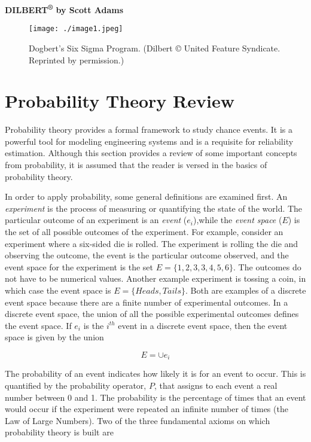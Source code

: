 \textbf{\hfill\break
DILBERT\textsuperscript{®} by Scott Adams}

\begin{figure}
\texttt{[image: ./image1.jpeg]}
\caption{Dogbert's Six Sigma Program. (Dilbert © United Feature Syndicate. Reprinted by
permission.)}
\label{figure:dilbert6sigma}
\end{figure}


\section{Probability Theory Review}
\label{section:probability-theory-review}

Probability theory provides a formal framework to study chance events.
It is a powerful tool for modeling engineering systems and is a
requisite for reliability estimation. Although this section provides a
review of some important concepts from probability, it is assumed that
the reader is versed in the basics of probability theory.

In order to apply probability, some general definitions are examined
first. An \emph{experiment} is the process of measuring or quantifying
the state of the world. The particular outcome of an experiment is an
\emph{event} ($e_i$),while the
\emph{event space} ($E$) is the set of all possible outcomes of the
experiment. For example, consider an experiment where a six-sided die is
rolled. The experiment is rolling the die and observing the outcome, the
event is the particular outcome observed, and the event space for the
experiment is the set $E = \{1,2,3,3,4,5,6\}$. The outcomes do not
have to be numerical values. Another example experiment is tossing a
coin, in which case the event space is $E=\{Heads, Tails\}$. Both
are examples of a discrete event space because there are a finite number
of experimental outcomes. In a discrete event space, the union of all
the possible experimental outcomes defines the event space. If
$e_i$ is the $i^{th}$
event in a discrete event space, then the event space is given by the
union

\begin{equation}
\label{eventSpaceUnion}
E = \cup e_i
\end{equation}

The probability of an event indicates how likely it is for an event to
occur. This is quantified by the probability operator, $P$, that
assigns to each event a real number between 0 and 1. The probability is
the percentage of times that an event would occur if the experiment were
repeated an infinite number of times (the Law of Large Numbers). Two of
the three fundamental axioms on which probability theory is built are

